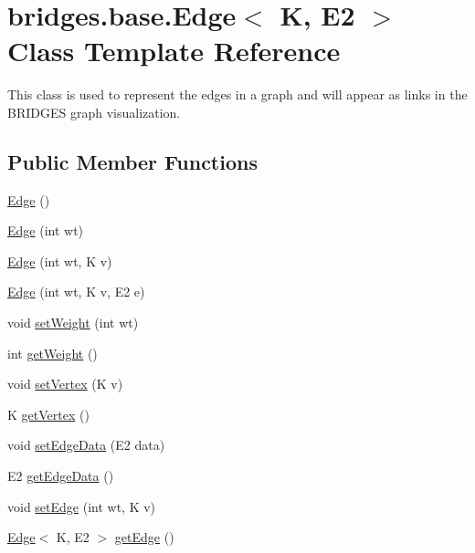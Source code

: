 \hypertarget{classbridges_1_1base_1_1_edge}{}\section{bridges.\+base.\+Edge$<$ K, E2 $>$ Class Template Reference}
\label{classbridges_1_1base_1_1_edge}


This class is used to represent the edges in a graph and will appear as links in the B\+R\+I\+D\+G\+ES graph visualization.  


\subsection*{Public Member Functions}
\begin{DoxyCompactItemize}
\item 
\mbox{\hyperlink{classbridges_1_1base_1_1_edge_a7b1ff43c94076afdc1b9be4665eefb9b}{Edge}} ()
\item 
\mbox{\hyperlink{classbridges_1_1base_1_1_edge_a8e9a4fb99d91f481e29c3ab632063267}{Edge}} (int wt)
\item 
\mbox{\hyperlink{classbridges_1_1base_1_1_edge_a545dc52ba877607102d36345cd80c583}{Edge}} (int wt, K v)
\item 
\mbox{\hyperlink{classbridges_1_1base_1_1_edge_ae909816352bcc2260969c9cfcf802fae}{Edge}} (int wt, K v, E2 e)
\item 
void \mbox{\hyperlink{classbridges_1_1base_1_1_edge_ad60cdae7be19065d528432c0c55f7b8c}{set\+Weight}} (int wt)
\item 
int \mbox{\hyperlink{classbridges_1_1base_1_1_edge_a63ad33282f3ae3ce48fb3fc8781b9916}{get\+Weight}} ()
\item 
void \mbox{\hyperlink{classbridges_1_1base_1_1_edge_a02684f6a156a82d431d5d82cf4f943a2}{set\+Vertex}} (K v)
\item 
K \mbox{\hyperlink{classbridges_1_1base_1_1_edge_a77eee3cc9fc7c00bc08388cd0f748285}{get\+Vertex}} ()
\item 
void \mbox{\hyperlink{classbridges_1_1base_1_1_edge_a733d7f5eb4950d1fc4e14b7096faeb5c}{set\+Edge\+Data}} (E2 data)
\item 
E2 \mbox{\hyperlink{classbridges_1_1base_1_1_edge_a19a623d647eb17b7e53f1360577b0703}{get\+Edge\+Data}} ()
\item 
void \mbox{\hyperlink{classbridges_1_1base_1_1_edge_aaa68d6a438529aebd69d8b45dc90314e}{set\+Edge}} (int wt, K v)
\item 
\mbox{\hyperlink{classbridges_1_1base_1_1_edge}{Edge}}$<$ K, E2 $>$ \mbox{\hyperlink{classbridges_1_1base_1_1_edge_a6f94904384aa54ec5f38073ebfcd49e8}{get\+Edge}} ()
\end{DoxyCompactItemize}


